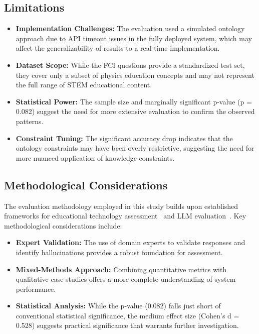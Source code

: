 \subsection{Limitations}
\begin{itemize}
    \item \textbf{Implementation Challenges:} The evaluation used a simulated ontology approach due to API timeout issues in the fully deployed system, which may affect the generalizability of results to a real-time implementation.
    
    \item \textbf{Dataset Scope:} While the FCI questions provide a standardized test set, they cover only a subset of physics education concepts and may not represent the full range of STEM educational content.
    
    \item \textbf{Statistical Power:} The sample size and marginally significant p-value (p = 0.082) suggest the need for more extensive evaluation to confirm the observed patterns.
    
    \item \textbf{Constraint Tuning:} The significant accuracy drop indicates that the ontology constraints may have been overly restrictive, suggesting the need for more nuanced application of knowledge constraints.
\end{itemize}

\subsection{Methodological Considerations}
The evaluation methodology employed in this study builds upon established frameworks for educational technology assessment~\cite{wilson2024educational} and LLM evaluation~\cite{chen2024comparing}. Key methodological considerations include:

\begin{itemize}
    \item \textbf{Expert Validation:} The use of domain experts to validate responses and identify hallucinations provides a robust foundation for assessment.
    
    \item \textbf{Mixed-Methods Approach:} Combining quantitative metrics with qualitative case studies offers a more complete understanding of system performance.
    
    \item \textbf{Statistical Analysis:} While the p-value (0.082) falls just short of conventional statistical significance, the medium effect size (Cohen's d = 0.528) suggests practical significance that warrants further investigation.
\end{itemize}


